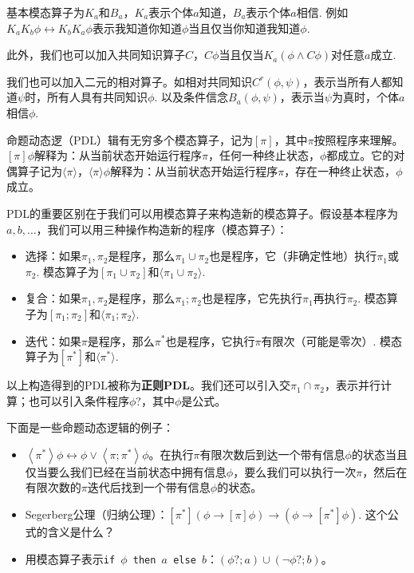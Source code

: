 \begin{example}[认知逻辑]
基本模态算子为$K_a$和$B_a$，$K_a$表示个体$a$知道，$B_a$表示个体$a$相信. 例如$K_aK_b\phi\leftrightarrow K_bK_a\phi$表示我知道你知道$\phi$当且仅当你知道我知道$\phi$.

此外，我们也可以加入共同知识算子$C$，$C \phi$当且仅当$K_a(\phi\wedge C\phi)$对任意$a$成立.

我们也可以加入二元的相对算子。如相对共同知识$C^r(\phi,\psi)$，表示当所有人都知道$\psi$时，所有人具有共同知识$\phi$. 以及条件信念$B_a(\phi,\psi)$，表示当$\psi$为真时，个体$a$相信$\phi$.
\end{example}

\begin{example}[命题动态逻辑]
命题动态逻（PDL）辑有无穷多个模态算子，记为$[\pi]$，其中$\pi$按照程序来理解。$[\pi]\phi$解释为：从当前状态开始运行程序$\pi$，任何一种终止状态，$\phi$都成立。它的对偶算子记为$\langle\pi\rangle$，$\langle\pi\rangle\phi$解释为：从当前状态开始运行程序$\pi$，存在一种终止状态，$\phi$成立。

PDL的重要区别在于我们可以用模态算子来构造新的模态算子。假设基本程序为$a,b,\dots$，我们可以用三种操作构造新的程序（模态算子）：
\begin{itemize}
    \item 选择：如果$\pi_1,\pi_2$是程序，那么$\pi_1\cup\pi_2$也是程序，它（非确定性地）执行$\pi_1$或$\pi_2$. 模态算子为$[\pi_1\cup\pi_2]$和$\langle\pi_1\cup\pi_2\rangle$.
    \item 复合：如果$\pi_1,\pi_2$是程序，那么$\pi_1;\pi_2$也是程序，它先执行$\pi_1$再执行$\pi_2$. 模态算子为$[\pi_1;\pi_2]$和$\langle\pi_1;\pi_2\rangle$.
    \item 迭代：如果$\pi$是程序，那么$\pi^*$也是程序，它执行$\pi$有限次（可能是零次）. 模态算子为$[\pi^*]$和$\langle\pi^*\rangle$.
\end{itemize}
以上构造得到的PDL被称为\textbf{正则PDL}。我们还可以引入交$\pi_1\cap\pi_2$，表示并行计算；也可以引入条件程序$\phi?$，其中$\phi$是公式。

下面是一些命题动态逻辑的例子：
\begin{itemize}
    \item $\left\langle\pi^*\right\rangle \phi \leftrightarrow \phi \vee\left\langle\pi ; \pi^*\right\rangle \phi$。在执行$\pi$有限次数后到达一个带有信息$\phi$的状态当且仅当要么我们已经在当前状态中拥有信息$\phi$，要么我们可以执行一次$\pi$，然后在有限次数的$\pi$迭代后找到一个带有信息$\phi$的状态。
    \item Segerberg公理（归纳公理）：$[\pi^*](\phi \to [\pi]\phi) \to (\phi \to [\pi^*]\phi)$. 这个公式的含义是什么？
    \item 用模态算子表示\texttt{if $\phi$ then $a$ else $b$}：$(\phi?;a)\cup(\neg\phi?;b)$。
\end{itemize}
\end{example}

